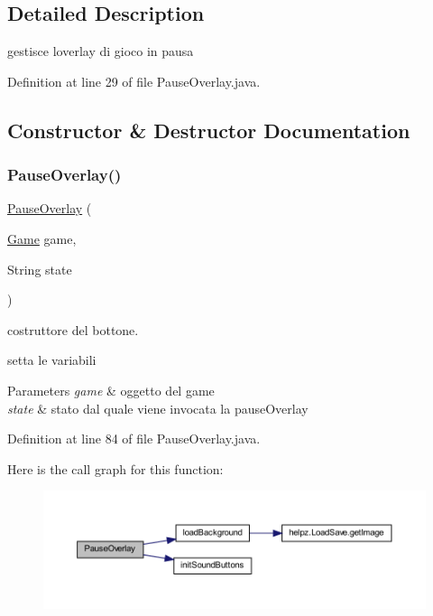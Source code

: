 \subsection{Detailed Description}
gestisce l\textquotesingle{}overlay di gioco in pausa 

Definition at line 29 of file Pause\+Overlay.\+java.



\subsection{Constructor \& Destructor Documentation}
\mbox{\label{classui_1_1_pause_overlay_a0e32a19d0569e8e64462db08f47ec52f}} 
\subsubsection{\texorpdfstring{Pause\+Overlay()}{PauseOverlay()}}
{\footnotesize\ttfamily \hyperlink{classui_1_1_pause_overlay}{Pause\+Overlay} (\begin{DoxyParamCaption}\item[{\hyperlink{classprogetto_1_1_game}{Game}}]{game,  }\item[{String}]{state }\end{DoxyParamCaption})}



costruttore del bottone. 

setta le variabili


\begin{DoxyParams}{Parameters}
{\em game} & oggetto del game \\
\hline
{\em state} & stato dal quale viene invocata la pause\+Overlay \\
\hline
\end{DoxyParams}


Definition at line 84 of file Pause\+Overlay.\+java.

Here is the call graph for this function\+:
\nopagebreak
\begin{figure}[H]
\begin{center}
\leavevmode
\includegraphics[width=350pt]{classui_1_1_pause_overlay_a0e32a19d0569e8e64462db08f47ec52f_cgraph}
\end{center}
\end{figure}


